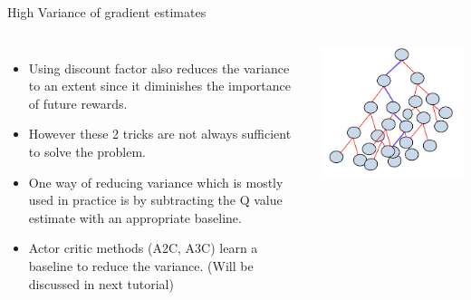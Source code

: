 \begin{frame}{High Variance of gradient estimates}
    \begin{columns}
        \begin{itemize}
            \item Using discount factor also reduces the variance to an extent since it diminishes the importance of future rewards.
            \item However these 2 tricks are not always sufficient to solve the problem.
            \item One way of reducing variance which is mostly used in practice is by subtracting the Q value estimate with an appropriate baseline.
            \item Actor critic methods (A2C, A3C) learn a baseline to reduce the variance. (Will be discussed in next tutorial)
        \end{itemize}
        \includegraphics[scale = 0.3]{img/highvar.png}
    \end{columns}    
\end{frame}

